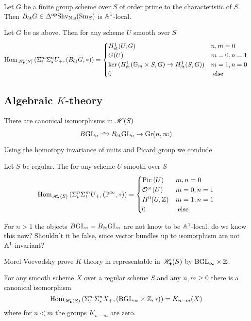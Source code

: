 \documentclass[12pt]{article}
\begin{document}
\begin{prop}
Let $G$ be a finite \etale group scheme over $S$ of order prime to the characteristic of $S$. Then $B_{\text{\'{e}t}} G \in \Delta^{\mathrm{op}} \mathrm{Shv}_{\mathrm{Nis}}(\mathrm{Sm}_S)$ is $\mathbb{A}^1$-local.
\end{prop}

\begin{cor}
Let $G$ be as above. Then for any scheme $U$ smooth over $S$
\[ \mathrm{Hom}_{\mathscr{H}_\bullet(S)} \left( \Sigma^m_t \Sigma^n_s U_+, (B_{\text{\'{e}t}} G, *) \right) = 
\begin{cases}
H^1_{\text{\'{e}t}}(U, G) & n,m = 0
\\
G(U) & m = 0, n = 1
\\
\ker{(H^1_{\text{\'{e}t}}(\mathbb{G}_m\times S, G) \to H^1_{\text{\'{e}t}}(S, G))} & m = 1, n = 0
\\
0 & \text{ else }
\end{cases} \]
\end{cor}

\subsection{Algebraic $K$-theory}

\newcommand{\BGL}{\mathrm{BGL}}

\begin{prop}
There are canonical isomorphisms in $\mathscr{H}(S)$ 
\[ B \GL_n \iso B_{\et} \GL_n \to \mathrm{Gr}(n, \infty) \]
\end{prop}

Using the homotopy invariance of units and Picard group we condude 
\begin{prop}
Let $S$ be regular. The for any scheme $U$ smooth over $S$ 
\[ \mathrm{Hom}_{\mathscr{H}_\bullet(S)} \left( \Sigma^n_t \Sigma^m_t U_+, (\mathbb{P}^\infty, *) \right) = 
\begin{cases}
\mathrm{Pic}^{} \left( U \right) & m,n = 0
\\
\mathcal{O}_{}^\times(U) & m = 0, n = 1
\\
H^0(U, \mathbb{Z}) & m = 1, n = 1
\\
0 & \text{ else}
\end{cases} \]
\end{prop}

For $n > 1$ the objects $B \mathrm{GL}_n = B_{\text{\'{e}t}} \mathrm{GL}_n$ are not know to be $\mathbb{A}^1$-local. {\color{red} do we know this now? Shouldn't it be false, since vector bundles up to isomorphism are not $\mathbb{A}^1$-invariant?}

Morel-Voevodsky prove $K$-theory in representable in $\mathscr{H}_\bullet(S)$ by $\BGL_\infty \times \Z$. 

\begin{theorem}
For any smooth scheme $X$ over a regular scheme $S$ and any $n,m \ge 0$ there is a canonical isomorphism
\[ \Hom{\H_\bullet(S)}{\Sigma_t^m \Sigma_s^n X_+}{(\BGL_\infty \times \Z, *)} = K_{n-m}(X) \]
where for $n < m$ the groups $K_{n-m}$ are zero. 
\end{theorem}
\end{document}
